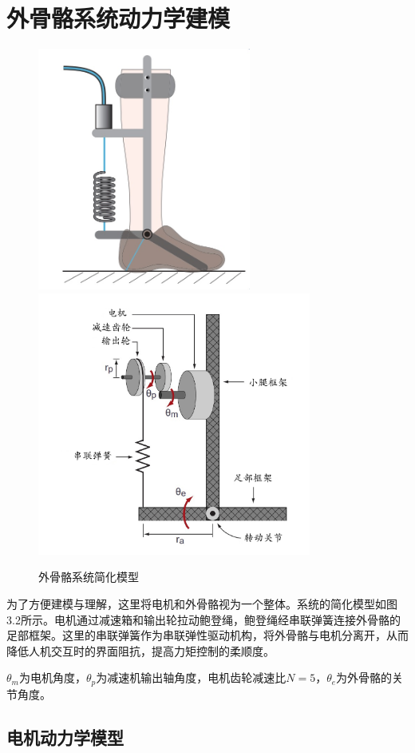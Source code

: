 \section{外骨骼系统动力学建模}

\begin{figure}[htb]
    \label{fig:sub1}{\includegraphics[width=7cm]{fig/f50.jpg}}
    \label{fig:sub2}{\includegraphics[width=9cm]{fig/f49.jpg}}
    \caption{外骨骼系统简化模型}
    \label{fig:subfigss}
\end{figure}

为了方便建模与理解，这里将电机和外骨骼视为一个整体。系统的简化模型如图3.2所示。电机通过减速箱和输出轮拉动鲍登绳，鲍登绳经串联弹簧连接外骨骼的足部框架。这里的串联弹簧作为串联弹性驱动机构，将外骨骼与电机分离开，从而降低人机交互时的界面阻抗，提高力矩控制的柔顺度。

$\theta_m$为电机角度，$\theta_p$为减速机输出轴角度，电机齿轮减速比$N=5$，$\theta_e$为外骨骼的关节角度。

\subsection{电机动力学模型}

